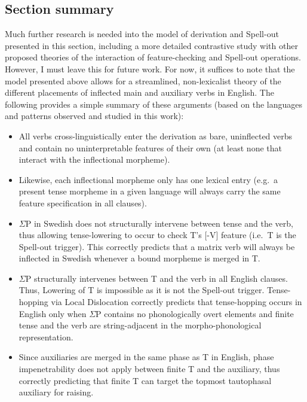 \subsection{Section summary}
Much further research is needed into the model of derivation and Spell-out presented in this section, including a more detailed contrastive study with other proposed theories of the interaction of feature-checking and Spell-out operations. However, I must leave this for future work. For now, it suffices to note that the model presented above allows for a streamlined, non-lexicalist theory of the different placements of inflected main and auxiliary verbs in English. The following provides a simple summary of these arguments (based on the languages and patterns observed and studied in this work):

\singlespacing
\begin{minipage}{5in}
\begin{itemize}
\item All verbs cross-linguistically enter the derivation as bare, uninflected verbs and contain no uninterpretable features of their own (at least none that interact with the inflectional morpheme).
\item Likewise, each inflectional morpheme only has one lexical entry (e.g.\ a present tense morpheme in a given language will always carry the same feature specification in all clauses).
\item $\Sigma$P in Swedish does not structurally intervene between tense and the verb, thus allowing tense-lowering to occur to check T's [-V] feature (i.e.\ T is the Spell-out trigger). This correctly predicts that a matrix verb will always be inflected in Swedish whenever a bound morpheme is merged in T.
\item $\Sigma$P structurally intervenes between T and the verb in all English clauses. Thus, Lowering of T is impossible as it is not the Spell-out trigger. Tense-hopping via Local Dislocation correctly predicts that tense-hopping occurs in English only when $\Sigma$P contains no phonologically overt elements and finite tense and the verb are string-adjacent in the morpho-phonological representation.
\item Since auxiliaries are merged in the same phase as T in English, phase impenetrability does not apply between finite T and the auxiliary, thus correctly predicting that finite T can target the topmost tautophasal auxiliary for raising.
\end{itemize}
\end{minipage}\\\\\\
